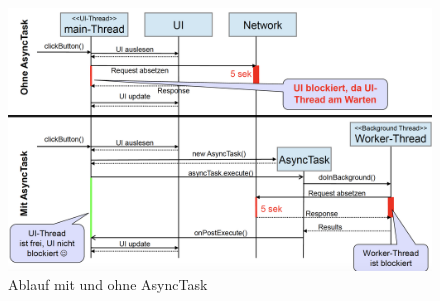 \documentclass[a4paper]{article}
\begin{document}
		\begin{figure}[htb!]
			\centering
			\includegraphics[width=\textwidth]{img/ablauf_asynctask.png}
			\caption{Ablauf mit und ohne AsyncTask}
		\end{figure}
	
		\newpage
\end{document}
